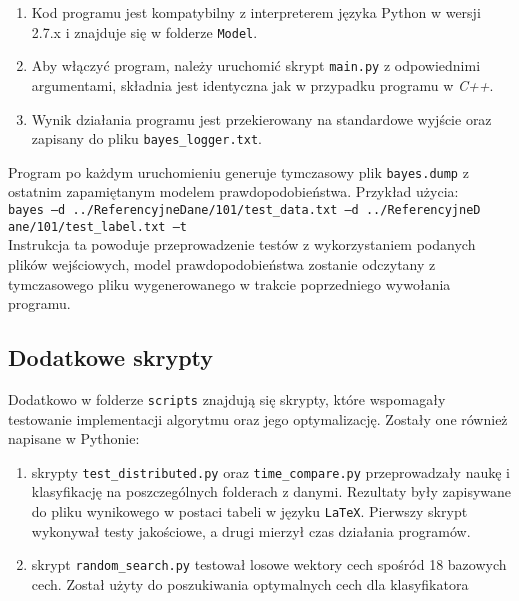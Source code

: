 \begin{enumerate}
	\item Kod programu jest kompatybilny z interpreterem języka Python w wersji 2.7.x i znajduje się w folderze \texttt{Model}.
	\item Aby włączyć program, należy uruchomić skrypt \texttt{main.py} z odpowiednimi argumentami, składnia jest identyczna jak w przypadku programu w \textit{C++}.
	\item Wynik działania programu jest przekierowany na standardowe wyjście oraz zapisany do pliku \texttt{bayes\_logger.txt}.
\end{enumerate}

Program po każdym uruchomieniu generuje tymczasowy plik \texttt{bayes.dump} z ostatnim zapamiętanym modelem prawdopodobieństwa. Przykład użycia:\\
\texttt{bayes --d ../ReferencyjneDane/101/test\_data.txt --d ../ReferencyjneD\\ane/101/test\_label.txt --t}\\ 
Instrukcja ta powoduje przeprowadzenie testów z wykorzystaniem podanych plików wejściowych, model prawdopodobieństwa zostanie odczytany z tymczasowego pliku wygenerowanego w trakcie poprzedniego wywołania programu.

\subsection{Dodatkowe skrypty}
\label{subsec_skrypty_instr}

Dodatkowo w folderze \texttt{scripts} znajdują się skrypty, które wspomagały testowanie implementacji algorytmu oraz jego optymalizację. Zostały one również napisane w Pythonie:

\begin{enumerate}
	\item skrypty \texttt{test\_distributed.py} oraz \texttt{time\_compare.py} przeprowadzały naukę i klasyfikację na poszczególnych folderach z danymi. Rezultaty były zapisywane do pliku wynikowego w postaci tabeli w języku \texttt{LaTeX}. Pierwszy skrypt wykonywał testy jakościowe, a drugi mierzył czas działania programów.
	\item skrypt \texttt{random\_search.py} testował losowe wektory cech spośród 18 bazowych cech. Został użyty do poszukiwania optymalnych cech dla klasyfikatora
\end{enumerate}